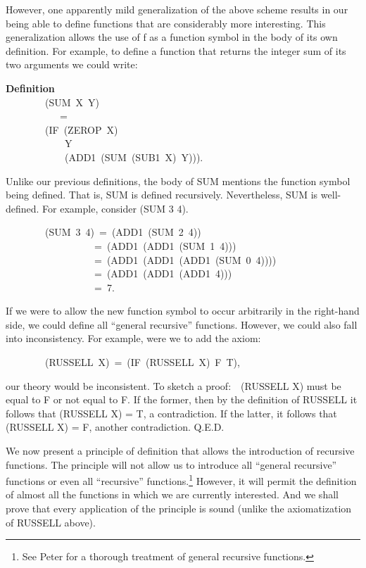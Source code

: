 \documentclass[10pt]{book}
\newenvironment{pubasis}{\begin{flushleft}}{\end{flushleft}}
\newcommand{\axiomordefinition}[1]{\vspace{6pt}\Large\textsf{\textbf{#1}}\normalsize}
\begin{document}
However, one apparently mild generalization of the above scheme results
in our being able to define functions that are considerably more
interesting.  This generalization  allows  the use of f as a 
function symbol in the body of its own definition.
For example, to define a function that returns the integer sum of
its two arguments we could write:
\begin{pubasis}
\axiomordefinition{Definition}\\
~~~~~~~~(SUM~X~Y)\\
~~~~~~~~~~~=~\\
~~~~~~~~(IF~(ZEROP~X)\\
~~~~~~~~~~~~Y\\
~~~~~~~~~~~~(ADD1~(SUM~(SUB1~X)~Y))).\\
\end{pubasis}
Unlike our previous definitions, the body of SUM mentions the 
function symbol being defined.  That is, SUM is defined recursively.
Nevertheless, SUM is well-defined.  For example, consider (SUM 3 4).
\begin{pubasis}
~~~~~~~~(SUM~3~4)~=~(ADD1~(SUM~2~4))\\
~~~~~~~~~~~~~~~~~~=~(ADD1~(ADD1~(SUM~1~4)))\\
~~~~~~~~~~~~~~~~~~=~(ADD1~(ADD1~(ADD1~(SUM~0~4))))\\
~~~~~~~~~~~~~~~~~~=~(ADD1~(ADD1~(ADD1~4)))\\
~~~~~~~~~~~~~~~~~~=~7.\\
\end{pubasis}
If we were to allow the new function symbol to occur arbitrarily
in the right-hand side, we could define  all
``general recursive''
functions.  However, we could also fall into inconsistency.
For example, were we to add the axiom:
\begin{pubasis}
~~~~~~~~(RUSSELL~X)~=~(IF~(RUSSELL~X)~F~T),\\
\end{pubasis}
our theory would be inconsistent.  To sketch a proof:~~(RUSSELL X) must be
equal to F or not equal to F.  If the former, then by the definition of RUSSELL
it follows that (RUSSELL X) = T, a contradiction.
If the latter, it follows that
(RUSSELL X) = F, another contradiction.
Q.E.D.

We now present  a principle of definition that allows
the introduction of  recursive functions.  The principle will not allow
us to introduce  all ``general recursive'' functions or even all ``recursive''
functions.\footnote{See Peter \cite{PETER} for a thorough treatment of general recursive functions.}  However, it will permit the definition of
almost  all  the functions in which we are currently
interested.  And we shall prove that every application of
the principle is sound (unlike the axiomatization of RUSSELL above).
\end{document}
